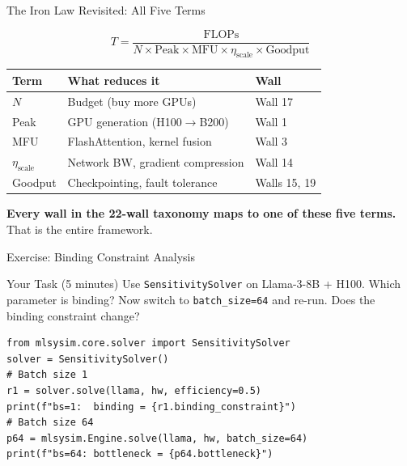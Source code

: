 \documentclass[aspectratio=169, 12pt]{beamer}
\begin{document}
\begin{frame}{The Iron Law Revisited: All Five Terms}
\begin{center}
\Large
\[
T = \frac{\text{FLOPs}}{N \times \text{Peak} \times \text{MFU} \times \eta_{\text{scale}} \times \text{Goodput}}
\]
\end{center}

\vspace{0.5em}
\centering
\begin{tabular}{lll}
\toprule
\textbf{Term} & \textbf{What reduces it} & \textbf{Wall} \\
\midrule
$N$                  & Budget (buy more GPUs)        & Wall 17 \\
Peak                 & GPU generation (H100$\to$B200)& Wall 1 \\
MFU                  & FlashAttention, kernel fusion  & Wall 3 \\
$\eta_{\text{scale}}$& Network BW, gradient compression & Wall 14 \\
Goodput              & Checkpointing, fault tolerance & Walls 15, 19 \\
\bottomrule
\end{tabular}

\vspace{0.5em}
\textbf{Every wall in the 22-wall taxonomy maps to one of these five terms.}\\
That is the entire framework.
\end{frame}

\begin{frame}[fragile]{Exercise: Binding Constraint Analysis}
\begin{alertblock}{Your Task (5 minutes)}
Use \texttt{SensitivitySolver} on Llama-3-8B + H100.
Which parameter is binding? Now switch to \texttt{batch\_size=64} and
re-run. Does the binding constraint change?
\end{alertblock}

\begin{lstlisting}
from mlsysim.core.solver import SensitivitySolver
solver = SensitivitySolver()
# Batch size 1
r1 = solver.solve(llama, hw, efficiency=0.5)
print(f"bs=1:  binding = {r1.binding_constraint}")
# Batch size 64
p64 = mlsysim.Engine.solve(llama, hw, batch_size=64)
print(f"bs=64: bottleneck = {p64.bottleneck}")
\end{lstlisting}

\end{frame}
\end{document}
